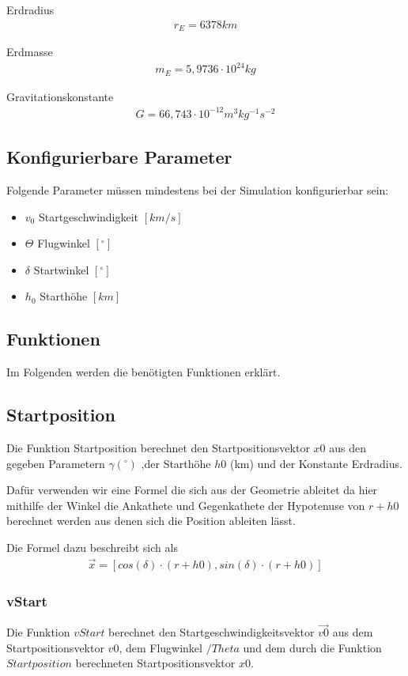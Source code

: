 \documentclass[]{scrartcl}
\begin{document}
Erdradius
\begin{align}
r_{E} = 6378 km
\end{align}

Erdmasse
\begin{align}
m_{E} = 5,9736 \cdot 10^{24} kg
\end{align}

Gravitationskonstante
\begin{align}
G = 66,743 \cdot 10^{-12} m^{3} kg^{-1} s^{-2}
\end{align}

\subsection{Konfigurierbare Parameter}
Folgende Parameter müssen mindestens bei der Simulation konfigurierbar sein:
\begin{itemize}
\item $v_{0}$ Startgeschwindigkeit $[km/s]$
\item $\Theta$ Flugwinkel $[^\circ]$
\item $\delta$ Startwinkel $[^\circ]$
\item $h_{0}$ Starthöhe $[km]$
\end{itemize}

\subsection{Funktionen}
Im Folgenden werden die benötigten Funktionen erklärt.

\subsection{Startposition}
Die Funktion Startposition berechnet den Startpositionsvektor $x0$ aus den gegeben Parametern $\gamma (^\circ)$ ,der Starthöhe $h0$ (km) und der Konstante Erdradius.

Dafür verwenden wir eine Formel die sich aus der Geometrie ableitet da hier mithilfe der Winkel die Ankathete und Gegenkathete der Hypotenuse von $r + h0$ berechnet werden aus denen sich die Position ableiten lässt.

Die Formel dazu beschreibt sich als 
\begin{align}
\vec{x} = [cos(\delta) \cdot( r + h0), sin(\delta) \cdot (r + h0)]
\end{align}

\subsubsection{vStart}
Die Funktion $vStart$ berechnet den Startgeschwindigkeitsvektor $\vec{v0}$ aus dem Startpositionsvektor $v0$, dem Flugwinkel $/Theta$ und dem durch die Funktion $Startposition$ berechneten Startpositionsvektor $x0$.
\end{document}
